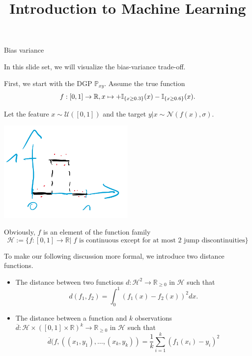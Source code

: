 \documentclass[11pt,compress,t,notes=noshow, xcolor=table]{beamer}
\title{Introduction to Machine Learning}
\date{}
\begin{document}


\begin{vbframe}{Bias variance}

In this slide set, we will visualize the bias-variance trade-off. \\
\lz 

First, we start with the DGP $\mathbb{P}_{xy}$. Assume the true function $$f: [0, 1] \rightarrow \mathbb{R}, x\mapsto +\mathbb{I}_{\{x \geq 0.3\}}(x) - \mathbb{I}_{\{x \geq 0.6\}}(x).$$

Let the feature $x \sim \mathcal{U}([0, 1])$ and the target $y\vert x \sim \mathcal{N}(f(x), \sigma).$
\begin{center}
\includegraphics[width=0.5\textwidth]{slides/regularization/figure_man/bv_true_fun.png}
\end{center}
\framebreak 

Obviously, $f$ is an element of the function family $$\mathcal{H} := \{f: [0, 1] \rightarrow \mathbb{R}\vert\; f \text{ is continuous except for at most 2 jump discontinuities}\}$$

To make our following discussion more formal, we introduce two distance functions.
\begin{itemize}
    \item The distance between two functions $d:\mathcal{H}^2\rightarrow \mathbb{R}_{\geq 0}$ in $\mathcal{H}$ such that $$d(f_1, f_2) = \int_0^1(f_1(x) - f_2(x))^2dx.$$
    \item The distance between a function and $k$ observations $\overline{d}:\mathcal{H}\times([0,1]\times \mathbb{R})^k \rightarrow \mathbb{R}_{\geq 0}$ in $\mathcal{H}$ such that 
    $$\overline d(f, ((x_1, y_1), \dots, (x_k, y_k)) = \frac{1}{k}\sum^k_{i=1}(f_1(x_i) - y_i)^2 $$
\end{itemize}



\end{vbframe}
\end{document}
